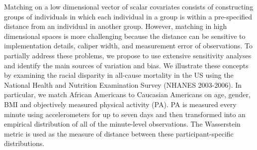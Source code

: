 Matching on a low dimensional vector of scalar covariates consists of constructing groups of individuals in which each individual in a group is within a pre-specified distance from an individual in another group. However, matching in high dimensional spaces is more challenging because the distance can be sensitive to implementation details, caliper width, and measurement error of observations. To partially address these problems, we propose to use extensive sensitivity analyses and identify the main sources of variation and bias. We illustrate these concepts by examining the racial disparity in all-cause mortality in the US using the National Health and Nutrition Examination Survey (NHANES 2003-2006). In particular, we match African Americans to Caucasian Americans on age, gender, BMI and objectively measured physical activity (PA). PA is measured every minute using accelerometers for up to seven days and then transformed into an empirical distribution of all of the minute-level observations. The Wasserstein metric is used as the measure of distance between these participant-specific distributions. 

   \begin{comment}


In looking to match on NHANES data, we identify four potential problems for using the Wasserstein distance in a high-dimensional setting: (1) the sensitivity to the choice of interval where the integration is conducted; (2) the sensitivity to the choice of the number of terms in the Riemann sum approximation; (3) the within-person, day-to-day variability in the measured physical activity can substantially affect the stability of Wasserstein; and (4) a lack of meaning for the values of the distances and a threshold used for the definition of closeness.

The complexities  understanding its meaning, and determining closeness pose complications.

Sensitivity analyses must be done
We found that variability in user chosen parameters led to different results- we identify key areas that lead to this 

Cautionary tale for anyone looking to do high-dimensional matching 

In particular, we formalize the problem, show that solutions will depend on a set of choices in terms of distance and calipers, and investigate the sensitivity of the results to these choices.

 and explore the impact of caliper selection, the computation of the distance, and within-person variability on the subgroups defined by matching and, consequently, on the estimators of $\exp(\gamma_1)$
\end{comment}